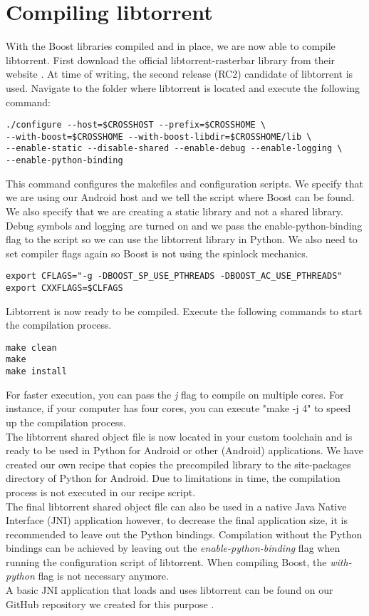 \section{Compiling libtorrent}
	With the Boost libraries compiled and in place, we are now able to compile libtorrent. First download the official libtorrent-rasterbar library from their website \cite{libtorrentrasterbar}. At time of writing, the second release (RC2) candidate of libtorrent is used. Navigate to the folder where libtorrent is located and execute the following command:
	\begin{lstlisting}
./configure --host=$CROSSHOST --prefix=$CROSSHOME \
--with-boost=$CROSSHOME --with-boost-libdir=$CROSSHOME/lib \
--enable-static --disable-shared --enable-debug --enable-logging \
--enable-python-binding
	\end{lstlisting}
	This command configures the makefiles and configuration scripts. We specify that we are using our Android host and we tell the script where Boost can be found. We also specify that we are creating a static library and not a shared library. Debug symbols and logging are turned on and we pass the enable-python-binding flag to the script so we can use the libtorrent library in Python. We also need to set compiler flags again so Boost is not using the spinlock mechanics.
	\begin{lstlisting}
export CFLAGS="-g -DBOOST_SP_USE_PTHREADS -DBOOST_AC_USE_PTHREADS"
export CXXFLAGS=$CLFAGS
	\end{lstlisting}
	Libtorrent is now ready to be compiled. Execute the following commands to start the compilation process.
	\begin{lstlisting}
make clean
make
make install
	\end{lstlisting}
	For faster execution, you can pass the \emph{j} flag to compile on multiple cores. For instance, if your computer has four cores, you can execute "make -j 4" to speed up the compilation process.\\
	The libtorrent shared object file is now located in your custom toolchain and is ready to be used in Python for Android or other (Android) applications. We have created our own recipe that copies the precompiled library to the site-packages directory of Python for Android. Due to limitations in time, the compilation process is not executed in our recipe script.\\
	The final libtorrent shared object file can also be used in a native Java Native Interface (JNI) application however, to decrease the final application size, it is recommended to leave out the Python bindings. Compilation without the Python bindings can be achieved by leaving out the \emph{enable-python-binding} flag when running the configuration script of libtorrent. When compiling Boost, the \emph{with-python} flag is not necessary anymore.\\
	A basic JNI application that loads and uses libtorrent can be found on our GitHub repository we created for this purpose \cite{hellolibtorrentgithub}.